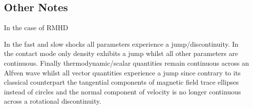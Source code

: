 \documentclass{article}
\begin{document}
\subsection{Other Notes}

In the case of RMHD 

In the fast and slow shocks all parameters experience a jump/discontinuity. In the contact mode only density exhibits a jump whilst all other parameters are continuous. Finally thermodynamic/scalar quantities remain continuous across an Alfven wave whilst all vector quantities experience a jump since contrary to its classical counterpart the tangential components of magnetic field trace ellipses instead of circles and the normal component of velocity is no longer continuous across a rotational discontinuity. 




\end{document}
